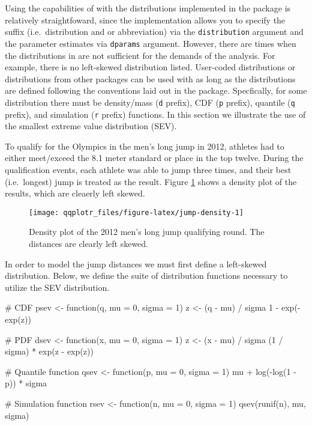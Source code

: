 Using the capabilities of  with the distributions
implemented in the  package is relatively straightfoward,
since the implementation allows you to specify the suffix
(i.e.~distribution and or abbreviation) via the \texttt{distribution}
argument and the parameter estimates via \texttt{dparams} argument.
However, there are times when the distributions in  are not
sufficient for the demands of the analysis. For example, there is no
left-skewed distribution listed. User-coded distributions or
distributions from other packages can be used with  as long
as the distributions are defined following the conventions laid out in
the  package. Specfically, for some distribution there must
be density/mass (\texttt{d} prefix), CDF (\texttt{p} prefix), quantile
(\texttt{q} prefix), and simulation (\texttt{r} prefix) functions. In
this section we illustrate the use of the smallest extreme value
distribution (SEV).

To qualify for the Olympics in the men's long jump in 2012, athletes had
to either meet/exceed the 8.1 meter standard or place in the top twelve.
During the qualification events, each athlete was able to jump three
times, and their best (i.e.~longest) jump is treated as the result.
Figure \ref{fig:jump-density} shows a density plot of the results, which
are cleaerly left skewed.

\begin{Schunk}
\begin{figure}

{\centering \texttt{[image: qqplotr\_files/figure-latex/jump-density-1]} 

}

\caption[Density plot of the 2012 men's long jump qualifying round]{Density plot of the 2012 men's long jump qualifying round. The distances are clearly left skewed.}\label{fig:jump-density}
\end{figure}
\end{Schunk}

In order to model the jump distances we must first define a left-skewed
distribution. Below, we define the suite of distribution functions
necessary to utilize the SEV distribution.

\begin{Schunk}
\begin{Sinput}
# CDF
psev <- function(q, mu = 0, sigma = 1) {
    z <- (q - mu) / sigma
    1 - exp(-exp(z))
}

# PDF
dsev <- function(x,  mu = 0, sigma = 1) {
  z <- (x - mu) / sigma
  (1 / sigma) * exp(z - exp(z))
}

# Quantile function
qsev <- function(p,  mu = 0, sigma = 1) {
  mu + log(-log(1 - p)) * sigma
}

# Simulation function
rsev <- function(n,  mu = 0, sigma = 1) {
  qsev(runif(n), mu, sigma)
}
\end{Sinput}
\end{Schunk}


